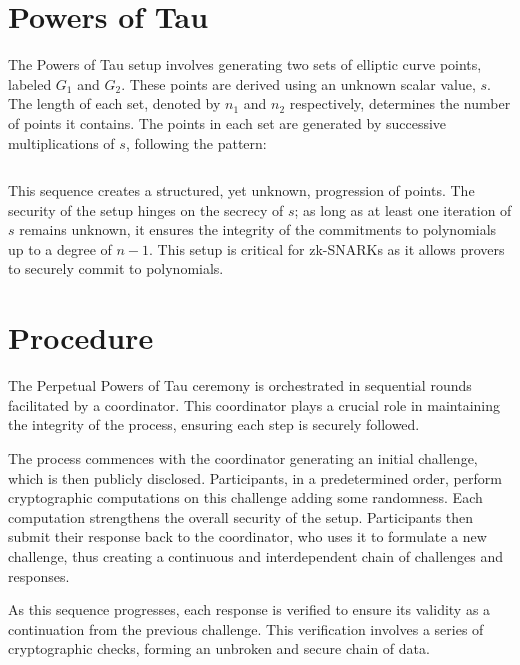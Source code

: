 \documentclass[11pt]{article}
\begin{document}
\section{Powers of Tau}
\label{sec:org30493e0}

The Powers of Tau setup involves generating two sets of elliptic curve points, labeled \(G_1\) and \(G_2\). These points are derived using an unknown scalar value, \(s\). The length of each set, denoted by \(n_1\) and \(n_2\) respectively, determines the number of points it contains. The points in each set are generated by successive multiplications of \(s\), following the pattern:

\begin{equation}
[G_1,G_1*s,G_1*s^2...G_1*s^{n_1-1}] \nonumber
\end{equation}
\begin{equation}
[G_2,G_2*s,G_2*s^2...G_2*s^{n_2-1}]  \nonumber
\end{equation}

This sequence creates a structured, yet unknown, progression of points. The security of the setup hinges on the secrecy of \(s\); as long as at least one iteration of \(s\) remains unknown, it ensures the integrity of the commitments to polynomials up to a degree of \(n-1\). This setup is critical for zk-SNARKs as it allows provers to securely commit to polynomials.
\section{Procedure}
\label{sec:org432197f}

The Perpetual Powers of Tau ceremony is orchestrated in sequential rounds facilitated by a coordinator. This coordinator plays a crucial role in maintaining the integrity of the process, ensuring each step is securely followed.

The process commences with the coordinator generating an initial challenge, which is then publicly disclosed. Participants, in a predetermined order, perform cryptographic computations on this challenge adding some randomness. Each computation strengthens the overall security of the setup. Participants then submit their response back to the coordinator, who uses it to formulate a new challenge, thus creating a continuous and interdependent chain of challenges and responses.

As this sequence progresses, each response is verified to ensure its validity as a continuation from the previous challenge. This verification involves a series of cryptographic checks, forming an unbroken and secure chain of data.
\end{document}
